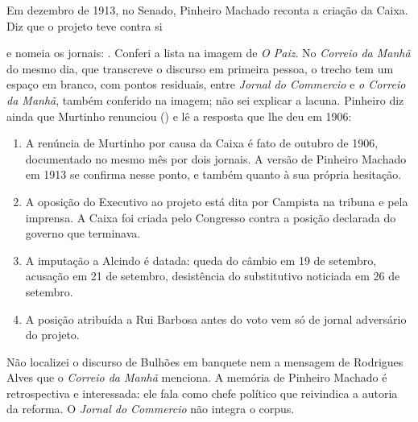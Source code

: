 
Em dezembro de 1913, no Senado, Pinheiro Machado reconta a criação da Caixa.
Diz que o projeto teve contra si


e nomeia os jornais: . Conferi a lista na imagem de \textit{O
Paiz}. No \textit{Correio da Manhã} do mesmo dia, que transcreve o discurso em
primeira pessoa, o trecho tem um espaço em branco, com pontos residuais, entre
\textit{Jornal do Commercio} e \textit{o Correio da Manhã}, também conferido na
imagem; não sei explicar a lacuna. Pinheiro diz ainda que Murtinho renunciou
() e lê a resposta que lhe
deu em 1906:



\begin{enumerate}[leftmargin=*,nosep]
\item A renúncia de Murtinho por causa da Caixa é fato de outubro de 1906,
documentado no mesmo mês por dois jornais. A versão de Pinheiro Machado em 1913
se confirma nesse ponto, e também quanto à sua própria hesitação.
\item A oposição do Executivo ao projeto está dita por Campista na tribuna e
pela imprensa. A Caixa foi criada pelo Congresso contra a posição declarada do governo que
terminava.
\item A imputação a Alcindo é datada: queda do câmbio em 19 de setembro,
acusação em 21 de setembro, desistência do substitutivo noticiada em 26 de
setembro.
\item A posição atribuída a Rui Barbosa antes do voto vem só de jornal
adversário do projeto.
\end{enumerate}


Não localizei o discurso de Bulhões em banquete nem a mensagem de Rodrigues
Alves que o \textit{Correio da Manhã} menciona. A memória de Pinheiro Machado é
retrospectiva e interessada: ele fala como chefe político que reivindica a
autoria da reforma. O \textit{Jornal do Commercio} não integra o corpus.
